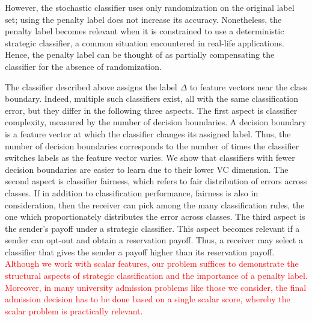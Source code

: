 However, the stochastic classifier uses only randomization on the original label set; using the penalty label does not increase its accuracy. Nonetheless, the penalty label becomes relevant when it is constrained to use a deterministic strategic classifier, a common situation encountered in real-life applications. Hence, the penalty label can be thought of as partially compensating the classifier for the absence of randomization.



The classifier described above assigns the label $\Delta$ to feature vectors near the class boundary. Indeed, multiple such classifiers exist, all with the same classification error, but they differ in the following three aspects.
The first aspect is classifier complexity, measured by the number of decision boundaries. A decision boundary is a feature vector at which the classifier changes its assigned label. Thus, the number of decision boundaries corresponds to the number of times the classifier switches labels as the feature vector varies. We show that classifiers with fewer decision boundaries are easier to learn due to their lower VC dimension.
The second aspect is classifier fairness, which refers to fair distribution of errors across classes. If in addition to classification performance, fairness is also in consideration, then the receiver can pick among the many classification rules, the one which proportionately distributes the error across classes. The third aspect is the sender's payoff under a strategic classifier. This aspect becomes relevant if a sender can opt-out and obtain a reservation payoff. Thus, a receiver may select a classifier that gives the sender a payoff higher than its reservation payoff. \textcolor{red}{ Although we work with scalar features, our problem suffices to demonstrate the structural
aspects of strategic classification and the importance of a penalty label. Moreover, in
 many university admission problems like those we consider, the final admission decision
 has to be done based on a single scalar score, whereby the scalar problem is practically relevant.}


